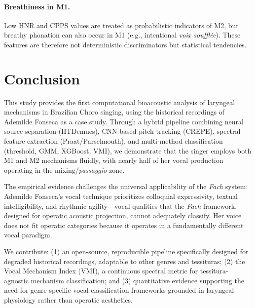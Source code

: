 \documentclass[review,3p,number]{elsarticle}
\begin{document}
\paragraph{Breathiness in M1.}
Low HNR and CPPS values are treated as probabilistic indicators of M2, but breathy
phonation can also occur in M1 (e.g., intentional \emph{voix souffl\'{e}e}). These
features are therefore not deterministic discriminators but statistical tendencies.

\section{Conclusion}
\label{sec:conclusion}

This study provides the first computational bioacoustic analysis of laryngeal
mechanisms in Brazilian Choro singing, using the historical recordings of Ademilde
Fonseca as a case study. Through a hybrid pipeline combining neural source
separation (HTDemucs), CNN-based pitch tracking (CREPE), spectral feature extraction
(Praat/Parselmouth), and multi-method classification (threshold, GMM, XGBoost, VMI),
we demonstrate that the singer employs both M1 and M2 mechanisms fluidly, with
nearly half of her vocal production operating in the mixing/\emph{passaggio} zone.

The empirical evidence challenges the universal applicability of the \emph{Fach}
system: Ademilde Fonseca's vocal technique prioritizes colloquial expressivity,
textual intelligibility, and rhythmic agility---vocal qualities that the \emph{Fach}
framework, designed for operatic acoustic projection, cannot adequately classify.
Her voice does not fit operatic categories because it operates in a fundamentally
different vocal paradigm.

We contribute: (1) an open-source, reproducible pipeline specifically designed for
degraded historical recordings, adaptable to other genres and tessituras; (2) the
Vocal Mechanism Index (VMI), a continuous spectral metric for tessitura-agnostic
mechanism classification; and (3) quantitative evidence supporting the need for
genre-specific vocal classification frameworks grounded in laryngeal physiology
rather than operatic aesthetics.
\end{document}
